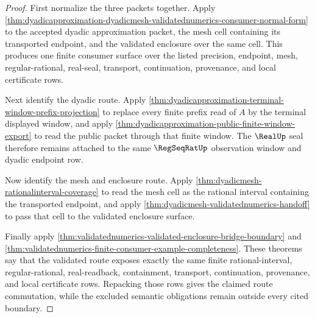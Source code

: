 \begin{proof}
First normalize the three packets together. Apply
\autoref{thm:dyadicapproximation-dyadicmesh-validatednumerics-consumer-normal-form}
to the accepted dyadic approximation packet, the mesh cell containing its
transported endpoint, and the validated enclosure over the same cell. This
produces one finite consumer surface over the listed precision, endpoint,
mesh, regular-rational, real-seal, transport, continuation, provenance, and
local certificate rows.

Next identify the dyadic route. Apply
\autoref{thm:dyadicapproximation-terminal-window-prefix-projection} to replace
every finite prefix read of $A$ by the terminal displayed window, and apply
\autoref{thm:dyadicapproximation-public-finite-window-export} to read the
public packet through that finite window. The $\RealUp$ seal therefore remains
attached to the same $\RegSeqRatUp$ observation window and dyadic endpoint row.

Now identify the mesh and enclosure route. Apply
\autoref{thm:dyadicmesh-rationalinterval-coverage} to read the mesh cell as
the rational interval containing the transported endpoint, and apply
\autoref{thm:dyadicmesh-validatednumerics-handoff} to pass that cell to the
validated enclosure surface.

Finally apply
\autoref{thm:validatednumerics-validated-enclosure-bridge-boundary} and
\autoref{thm:validatednumerics-finite-consumer-example-completeness}. These
theorems say that the validated route exposes exactly the same finite
rational-interval, regular-rational, real-readback, containment, transport,
continuation, provenance, and local certificate rows. Repacking those rows
gives the claimed route commutation, while the excluded semantic obligations
remain outside every cited boundary.
\end{proof}
